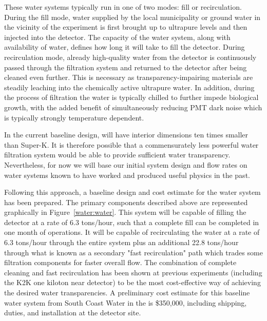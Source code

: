 These water systems typically run in one of two modes: fill or
recirculation.  During the fill mode, water supplied by the local
municipality or ground water in the vicinity of the experiment is first brought
up to ultrapure levels and then injected into the detector.  The capacity of the water 
system, along with availability of water, defines how long it will take to fill the detector.  
During recirculation mode, already high-quality water from the detector is
continuously passed through the filtration system and returned to the
detector after being cleaned even further. This is necessary as transparency-impairing
materials are steadily leaching into the chemically active ultrapure water.  In addition, 
during the process of filtration the water is typically chilled to further
impede biological growth, with the added benefit of simultaneously reducing PMT 
dark noise which is typically strongly temperature dependent.

In the current baseline design, \nuprism will have interior dimensions ten times smaller than Super-K.
It is therefore possible that a commensurately less powerful water filtration system would be able to
provide sufficient water transparency.  Nevertheless, for now we will base our initial system design 
and flow rates on water systems known to have worked and produced useful physics in the past.

Following this approach, a baseline design and cost estimate for the \nuprism water system 
has been prepared.  The primary components described above are represented graphically in 
Figure~\ref{water:water}. This system will be capable of filling the detector at a rate of 
6.3 tons/hour, such that a complete fill can be completed in one month of operations.  
It will be capable of recirculating the water at a rate of  6.3 tons/hour through the entire system 
plus an additional 22.8 tons/hour through what is known as a secondary "fast recirculation" 
path which trades some filtration components for faster overall flow. The combination of 
complete cleaning and fast recirculation has been shown at previous experiments (including 
the K2K one kiloton near detector) to be the most cost-effective way of achieving the desired 
water transparencies.  A preliminary cost estimate for this baseline water system from South Coast Water in the is \$350,000, including shipping, duties, and installation at the detector site.

